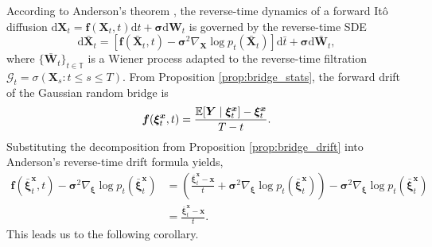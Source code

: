 \documentclass{article}
\def\T{\mathbb{T}}
\theoremstyle{definition}
\begin{document}
According to Anderson's theorem \cite{anderson_reverse-time_1982}, the reverse-time dynamics of a forward It\^{o} diffusion $\mathrm{d}\boldsymbol{X}_t = \boldsymbol{f}(\boldsymbol{X}_t, t)\mathrm{d}t + \boldsymbol{\sigma}\mathrm{d}\mathbf{W}_t$ is governed by the reverse-time SDE
\begin{equation*}
    \mathrm{d}\bar{\boldsymbol{X}}_t = \left[ \boldsymbol{f}(\bar{\boldsymbol{X}}_t, t) - \boldsymbol{\sigma}^2 \nabla_{\boldsymbol{X}} \log p_t(\bar{\boldsymbol{X}}_t) \right] \mathrm{d}\bar{t} + \boldsymbol{\sigma} \mathrm{d}\bar{\mathbf{W}}_t,
\end{equation*}
where $\{\bar{\mathbf{W}}_t\}_{t\in\T}$ is a Wiener process adapted to the reverse-time filtration $\mathcal{G}_t = \sigma(\boldsymbol{X}_s : t \le s \le T)$. From Proposition \ref{prop:bridge_stats}, the forward drift of the Gaussian random bridge is
\begin{align}
\boldsymbol{f}(\boldsymbol{\xi}^{\boldsymbol{x}}_t, t) = \frac{\mathbb{E}[\boldsymbol{Y} \mid \boldsymbol{\xi}^{\boldsymbol{x}}_t] - \boldsymbol{\xi}^{\boldsymbol{x}}_t}{T-t}. \notag
\end{align}
Substituting the decomposition from Proposition \ref{prop:bridge_drift} into Anderson's reverse-time drift formula yields,
    \begin{align*}
        \boldsymbol{f}(\bar{\boldsymbol{\xi}}^{\boldsymbol{x}}_t, t) - \boldsymbol{\sigma}^2 \nabla_{\boldsymbol{\xi}} \log p_t(\bar{\boldsymbol{\xi}}^{\boldsymbol{x}}_t) &= \left( \frac{\bar{\boldsymbol{\xi}}^{\boldsymbol{x}}_t - \boldsymbol{x}}{t} + \boldsymbol{\sigma}^2 \nabla_{\boldsymbol{\xi}} \log p_t(\bar{\boldsymbol{\xi}}^{\boldsymbol{x}}_t) \right) - \boldsymbol{\sigma}^2 \nabla_{\boldsymbol{\xi}} \log p_t(\bar{\boldsymbol{\xi}}^{\boldsymbol{x}}_t) \\
        &= \frac{\bar{\boldsymbol{\xi}}^{\boldsymbol{x}}_t - \boldsymbol{x}}{t}.
    \end{align*}
This leads us to the following corollary.
\end{document}
